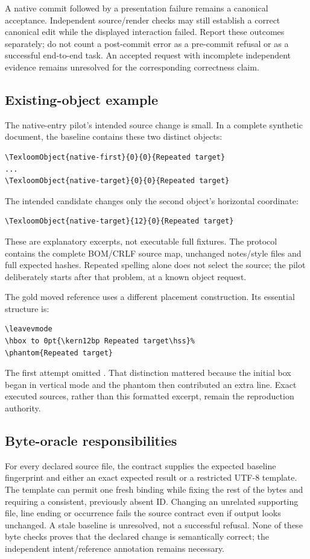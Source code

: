 A native commit followed by a presentation failure remains a canonical
acceptance. Independent source/render checks may still establish a correct
canonical edit while the displayed interaction failed. Report these outcomes
separately; do not count a post-commit error as a pre-commit refusal or as a
successful end-to-end task. An accepted request with incomplete independent
evidence remains unresolved for the corresponding correctness claim.

\subsection{Existing-object example}
The native-entry pilot's intended source change is small. In a complete
synthetic document, the baseline contains these two distinct objects:
\begin{verbatim}
\TexloomObject{native-first}{0}{0}{Repeated target}
...
\TexloomObject{native-target}{0}{0}{Repeated target}
\end{verbatim}
The intended candidate changes only the second object's horizontal coordinate:
\begin{verbatim}
\TexloomObject{native-target}{12}{0}{Repeated target}
\end{verbatim}
These are explanatory excerpts, not executable full fixtures. The protocol
contains the complete BOM/CRLF source map, unchanged notes/style files and
full expected hashes. Repeated spelling alone does not select the source;
the pilot deliberately starts after that problem, at a known object request.

The gold moved reference uses a different placement construction. Its essential
structure is:
\begin{verbatim}
\leavevmode
\hbox to 0pt{\kern12bp Repeated target\hss}%
\phantom{Repeated target}
\end{verbatim}
The first attempt omitted . That distinction mattered because
the initial box began in vertical mode and the phantom then contributed an
extra line. Exact executed sources, rather than this formatted excerpt, remain
the reproduction authority.

\subsection{Byte-oracle responsibilities}
For every declared source file, the contract supplies the expected baseline
fingerprint and either an exact expected result or a restricted UTF-8 template.
The template can permit one fresh  binding while fixing
the rest of the bytes and requiring a consistent, previously absent ID.
Changing an unrelated supporting file, line ending or occurrence fails the
source contract even if output looks unchanged. A stale baseline is unresolved,
not a successful refusal. None of these byte checks proves that the declared
change is semantically correct; the independent intent/reference annotation
remains necessary.

